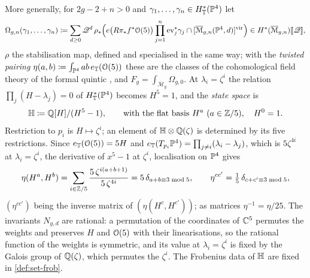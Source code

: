 \begin{defn}
More generally, for $2g-2+n>0$ and $\gamma_1,\dots,\gamma_n\in H^*_{\mathbb{T}}(\mathbb{P}^4)$ let
\[
\Omega_{g,n}(\gamma_1,\dots,\gamma_n)\coloneqq\sum_{d\geq0}\mathscr{Q}^d\,\rho_*\Bigl(e\bigl(R\pi_*f^*\mathcal{O}(5)\bigr)\prod_{j=1}^n\mathrm{ev}_j^*\gamma_j\cap[\overline{\mathcal M}_{g,n}(\mathbb{P}^4,d)]^{\mathrm{vir}}\Bigr)\in H^*(\overline{\mathcal M}_{g,n})[\![ \mathscr{Q} ]\!],
\]
$\rho$ the stabilisation map, defined and specialised in the same way; with the \emph{twisted pairing} $\eta(a,b)\coloneqq\int_{\mathbb{P}^4}ab\,e_{\mathbb{T}}(\mathcal{O}(5))$ these are the classes of the cohomological field theory of the formal quintic \cite[Section~4.1]{GJR18}, and $F_g=\int_{\overline{\mathcal M}_g}\Omega_{g,0}$. At $\lambda_i=\zeta^i$ the relation $\prod_j(H-\lambda_j)=0$ of $H^*_{\mathbb{T}}(\mathbb{P}^4)$ becomes $H^5=1$, and the \emph{state space} is
\[
\mathbb{H}\coloneqq\mathbb{Q}[H]/(H^5-1),\qquad\text{with the flat basis }H^a\ (a\in\mathbb{Z}/5),\quad H^0=1 .
\]
Restriction to $p_i$ is $H\mapsto\zeta^i$; an element of $\mathbb{H}\otimes\mathbb{Q}(\zeta)$ is determined by its five restrictions. Since $e_{\mathbb{T}}(\mathcal{O}(5))=5H$ and $e_{\mathbb{T}}(T_{p_i}\mathbb{P}^4)=\prod_{j\neq i}(\lambda_i-\lambda_j)$, which is $5\zeta^{4i}$ at $\lambda_i=\zeta^i$, the derivative of $x^5-1$ at $\zeta^i$, localisation on $\mathbb{P}^4$ gives
\[
\eta(H^a,H^b)=\sum_{i\in\mathbb{Z}/5}\frac{5\,\zeta^{i(a+b+1)}}{5\,\zeta^{4i}}=5\,\delta_{a+b\equiv3\bmod5},\qquad\eta^{cc'}=\tfrac15\,\delta_{c+c'\equiv3\bmod5},
\]
$(\eta^{cc'})$ being the inverse matrix of $(\eta(H^c,H^{c'}))$; as matrices $\eta^{-1}=\eta/25$. The invariants $N_{g,d}$ are rational: a permutation of the coordinates of $\mathbb{C}^5$ permutes the weights and preserves $H$ and $\mathcal{O}(5)$ with their linearisations, so the rational function of the weights is symmetric, and its value at $\lambda_i=\zeta^i$ is fixed by the Galois group of $\mathbb{Q}(\zeta)$, which permutes the $\zeta^i$. The Frobenius data of $\mathbb{H}$ are fixed in \cref{def:set-frob}.
\end{defn}

